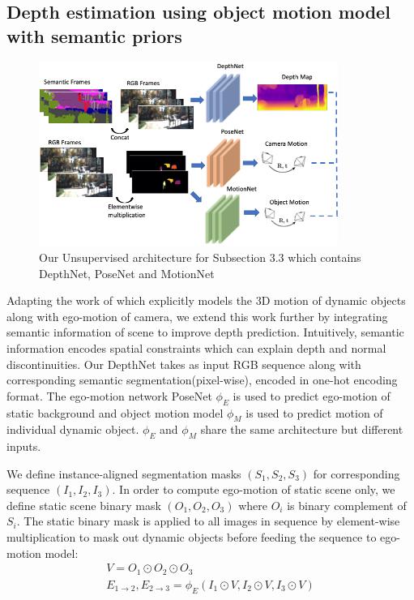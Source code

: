 \documentclass[10pt,twocolumn,letterpaper]{article}
\begin{document}

\subsection{Depth estimation using object motion model with semantic priors}

\begin{figure}
    \centering
    \includegraphics[width=\linewidth, height=6cm]{architecture.png}
    \caption{Our Unsupervised architecture for Subsection 3.3 which contains DepthNet, PoseNet and MotionNet}
    \label{fig:arch}
\end{figure}

Adapting the work of \cite{casser2018depth} which explicitly models the 3D motion of dynamic objects along with ego-motion of camera, we extend this work further by integrating semantic information of scene to improve depth prediction. Intuitively, semantic information encodes spatial constraints which can explain depth and normal discontinuities. Our DepthNet takes as input RGB sequence along with corresponding semantic segmentation(pixel-wise), encoded in one-hot encoding format. The ego-motion network PoseNet $\phi_{E}$ is used to predict ego-motion of static background and object motion model $\phi_{M}$ is used to predict motion of individual dynamic object. $\phi_{E}$ and $\phi_{M}$ share the same architecture but different inputs. 

We define instance-aligned segmentation masks $(S_{1}, S_{2}, S_{3})$ for corresponding sequence $(I_{1}, I_{2}, I_{3})$. In order to compute ego-motion of static scene only, we define static scene binary mask $(O_{1}, O_{2}, O_{3})$ where $O_{i}$ is binary complement of $S_{i}$. The static binary mask is applied to all images in sequence by element-wise multiplication to mask out dynamic objects before feeding the sequence to ego-motion model:
\begin{multline}
    V = O_{1} \odot O_{2} \odot O_{3} 
    \\
 E_{1\rightarrow2}, E_{2\rightarrow3} = \phi_{E}(I_{1} \odot V, I_{2} \odot V, I_{3} \odot V) 
\end{multline}
\end{document}
